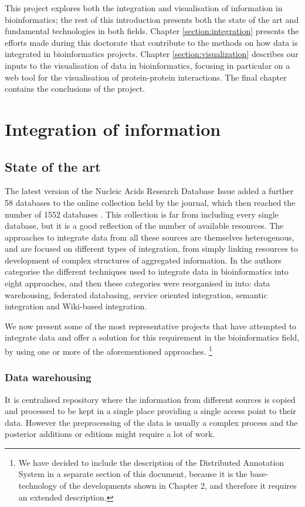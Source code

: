 This project explores both the integration and visualisation of information in bioinformatics; the rest of this introduction presents both the state of the art and fundamental technologies in both fields. Chapter \ref{section:integration} presents the efforts made during this doctorate that contribute to the methods on how data is integrated in bioinformatics projects. Chapter \ref{section:visualization} describes our inputs to the visualisation of data in bioinformatics, focusing in particular on a web tool for the visualisation of protein-protein interactions. The final chapter contains the conclusions of the project.

\section{Integration of information}
\subsection{State of the art}
The latest version of the Nucleic Acids Research Database Issue added a further 58 databases to the online collection held by the journal, which then reached the number of 1552 databases \cite{FER2014}. This collection is far from including every single database, but it is  a good reflection of the number of available resources.
The approaches to integrate data from all these sources are themselves heterogenous, and are focused on different types of integration, from simply linking resources to development of complex structures of aggregated information. In \cite{GOB2008} the authors categorise the different techniques used to integrate data in bioinformatics into eight approaches, and then these categories were reorganised in \cite{ZHA2011b} into: data warehousing, federated databasing, service oriented integration, semantic integration and Wiki-based integration.

We now present some of the most representative projects that have attempted to integrate data and offer a solution for this requirement in the bioinformatics field, by using one or more of the aforementioned approaches. \footnote{We have decided to include the description of the Distributed Annotation System in a separate section of this document, because it is the base-technology of the developments shown in Chapter 2, and therefore it requires an extended description.}

\subsubsection{Data warehousing} 
It is centralised repository where the information from different sources is copied and processed to be kept  in a single place providing a single access point to their data. However the preprocessing of the data is usually a complex process and the posterior additions or editions might require a lot of work.

